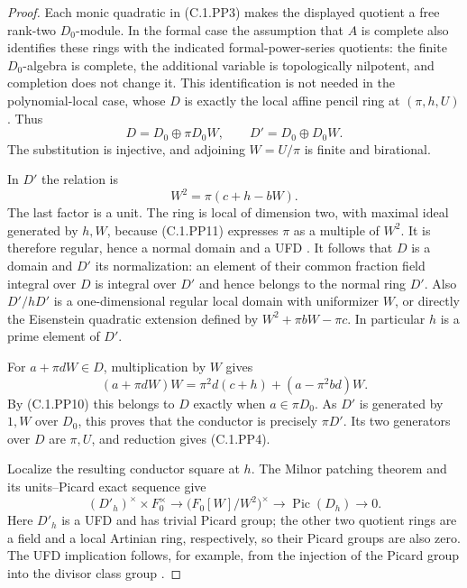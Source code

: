 \begin{proof}
Each monic quadratic in (C.1.PP3) makes the displayed quotient
a free rank-two $D_0$-module.
In the formal case the assumption that $A$ is complete also
identifies these rings with the indicated formal-power-series
quotients: the finite $D_0$-algebra is complete, the additional
variable is topologically nilpotent, and completion does not
change it.  This identification is not needed in the
polynomial-local case, whose $D$ is exactly the local affine
pencil ring at $(\pi,h,U)$.
Thus
\[
             D=D_0\oplus\pi D_0W,
             \qquad D'=D_0\oplus D_0W.              \tag{C.1.PP10}
\]
The substitution is injective, and adjoining $W=U/\pi$ is
finite and birational.

In $D'$ the relation is
\[
                    W^2=\pi(c+h-bW).                \tag{C.1.PP11}
\]
The last factor is a unit.  The ring is local of dimension two,
with maximal ideal generated by $h,W$, because (C.1.PP11)
expresses $\pi$ as a multiple of $W^2$.
It is therefore regular, hence a normal domain and a UFD
\cite[Tag 0AG0]{C-NormalNodesStacks}.
It follows that $D$ is a domain and $D'$ its normalization:
an element of their common fraction field integral over $D$
is integral over $D'$ and hence belongs to the normal ring $D'$.
Also $D'/hD'$ is a one-dimensional regular local domain with
uniformizer $W$, or directly the Eisenstein quadratic extension
defined by $W^2+\pi bW-\pi c$.
In particular $h$ is a prime element of $D'$.

For $a+\pi dW\in D$, multiplication by $W$ gives
\[
 (a+\pi dW)W
       =\pi^2d(c+h)+(a-\pi^2bd)W.
\]
By (C.1.PP10) this belongs to $D$ exactly when $a\in\pi D_0$.
As $D'$ is generated by $1,W$ over $D_0$, this proves that
the conductor is precisely $\pi D'$.
Its two generators over $D$ are $\pi,U$, and reduction gives
(C.1.PP4).

Localize the resulting conductor square at $h$.
The Milnor patching theorem and its units--Picard exact sequence
\cite[I.2.6--2.7 and I.3.10]{C-WeibelKbook2013} give
\[
 (D'_h)^\times\times F_0^\times
   \longrightarrow
   \bigl(F_0[W]/W^2\bigr)^\times
   \longrightarrow\operatorname{Pic}(D_h)
   \longrightarrow0.                                \tag{C.1.PP12}
\]
Here $D'_h$ is a UFD and has trivial Picard group; the other
two quotient rings are a field and a local Artinian ring,
respectively, so their Picard groups are also zero.
The UFD implication follows, for example, from the injection
of the Picard group into the divisor class group
\cite[I.3.6--3.7]{C-WeibelKbook2013}.


\end{proof}
